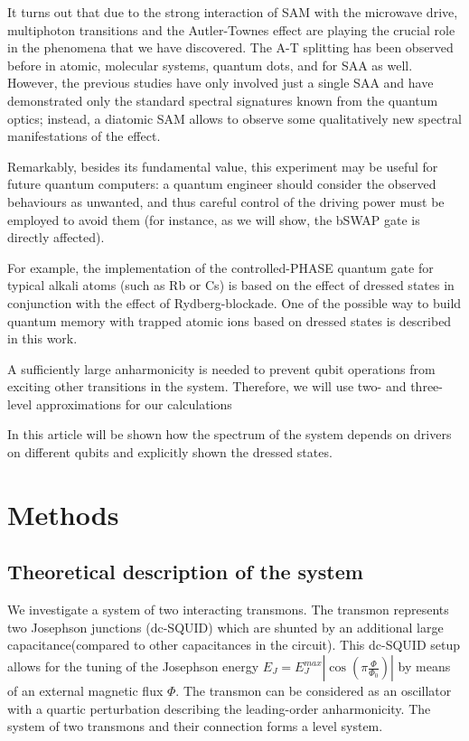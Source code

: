 \documentclass[%
 aip,
 amsmath,amssymb,
 reprint,%
]{revtex4-1}
\begin{document}
It turns out that due to the strong interaction of SAM with the microwave drive, multiphoton transitions and the Autler-Townes effect are playing the crucial role in the phenomena that we have discovered. The A-T splitting has been observed before in atomic\cite{picque1976direct}, molecular systems\cite{tamarat1995pump}, quantum dots\cite{xu2007coherent}, and for SAA as well\cite{baur2009measurement, sillanpaa2009autler, novikov2013autler, suri2013observation, peng2018vacuum}. However, the previous studies have  only involved just a single SAA and have demonstrated only the standard spectral signatures known from the quantum optics; instead, a diatomic SAM allows to observe some qualitatively new spectral manifestations of the effect. 

Remarkably, besides its fundamental value, this experiment may be useful for future quantum computers: a quantum engineer should consider the observed behaviours as unwanted, and thus careful control of the driving power must be employed to avoid them (for instance, as we will show, the bSWAP gate\cite{poletto2012entanglement} is directly affected).



For example, the implementation of the controlled-PHASE quantum gate for typical alkali atoms (such as Rb or Cs)  is based on the effect of dressed states in conjunction with the effect of Rydberg-blockade\cite{sun2018analysis}. One of the possible way to build quantum memory with trapped atomic ions based on dressed states is described in this work\cite{timoney2011quantum}. 

A sufficiently large anharmonicity is needed to prevent qubit operations from exciting other transitions in the system. Therefore, we will use two- and three-level approximations for our calculations


In this article will be shown how the spectrum of the system depends on drivers on different qubits and explicitly shown the dressed states.%
 
\section{Methods}
\subsection{Theoretical description of the system}

We investigate a system of two interacting transmons. The transmon represents two Josephson junctions (dc-SQUID) which are shunted by an additional large capacitance(compared to other capacitances in the circuit). This dc-SQUID setup allows for the tuning of the Josephson energy $E_J = E_J^{max}|\cos(\pi \frac{\Phi}{\Phi_0})|$  by
means of an external magnetic flux $\Phi$. The transmon can be considered as an oscillator with a quartic perturbation describing the leading-order anharmonicity. The system of two transmons and their connection forms a level system.
\end{document}
